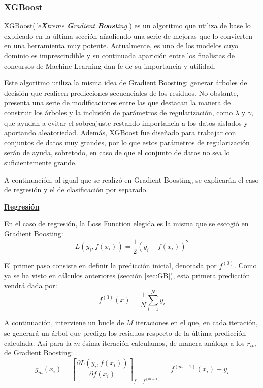 \documentclass[12pt,twoside]{article}
\begin{document}
\subsubsection{XGBoost} \label{sec:XGBoost}
XGBoost(\textit{'e\textbf{X}treme \textbf{G}radient \textbf{Boost}ing'}) \cite{CH01} es un algoritmo que utiliza de base lo explicado en la última sección añadiendo una serie de mejoras que lo convierten en una herramienta muy potente. Actualmente, es uno de los modelos cuyo dominio es imprescindible y su continuada aparición entre los finalistas de concursos de Machine Learning dan fe de su importancia y utilidad.

Este algoritmo utiliza la misma idea de Gradient Boosting: generar árboles de decisión que realicen predicciones secuenciales de los residuos. No obstante, presenta una serie de modificaciones entre las que destacan la manera de construir los árboles y la inclusión de parámetros de regularización, como $\lambda$ y $\gamma$, que ayudan a evitar el sobreajuste restando importancia a los datos aislados y aportando aleatoriedad. Además, XGBoost fue diseñado para trabajar con conjuntos de datos muy grandes, por lo que estos parámetros de regularización serán de ayuda, sobretodo, en caso de que el conjunto de datos no sea lo suficientemente grande.

A continuación, al igual que se realizó en Gradient Boosting, se explicarán el caso de regresión y el de clasificación por separado.



\bigskip \bigskip

\textbf{\underline{Regresión}}

En el caso de regresión, la Loss Function elegida es la misma que se escogió en Gradient Boosting:
\begin{equation*}
L(y_i, f(x_i)) = \frac{1}{2}(y_i - f(x_i))^2
\end{equation*}

El primer paso consiste en definir la predicción inicial, denotada por $f^{(0)}$. Como ya se ha visto en cálculos anteriores (sección \ref{sec:GB}), esta primera predicción vendrá dada por:
\begin{equation*}
f^{(0)}(x) = \frac{1}{N} \sum_{i=1}^N y_i
\end{equation*}

A continuación, interviene un bucle de $M$ iteraciones en el que, en cada iteración, se generará un árbol que prediga los residuos respecto de la última predicción calculada. Así para la $m$-ésima iteración calculamos, de manera análoga a los $r_{im}$ de Gradient Boosting:
\begin{equation*}
g_{m}(x_i) = \left[ \frac{\partial L(y_i, f(x_i))}{\partial f(x_i)} \right]_{f = f^{(m-1)}} = f^{(m-1)}(x_i) - y_i
\end{equation*}
\end{document}
